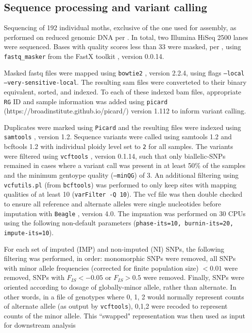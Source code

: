 \documentclass[fleqn,11pt]{wlpeerj}
\begin{document}
\subsection*{Sequence processing and variant calling} Sequencing of 192
individual moths, exclusive of the one used for assembly,  as performed on
reduced genomic DNA per \cite{PARCHMAN:2012ca}. In total, two  Illumina HiSeq
2500 lanes were sequenced. Bases with quality scores less than 33 were masked,
per \cite{Yun:2014dn},  using \texttt{fastq\_masker} from the FastX toolkit
\citep{citeulike:9103573}, version 0.0.14.

Masked fastq files were mapped using \texttt{bowtie2} \cite{Langmead:2012jh},
version 2.2.4, using flags \texttt{--local --very-sensitive-local}.  The
resulting  sam files were converteted to their binary equivalent, sorted, and
indexed. To each of these indexed bam files, appropriate \texttt{RG} ID and
sample information was added using \texttt{picard}
(https://broadinstitute.github.io/picard/) version 1.112 to inform variant
calling.

Duplicates were marked using \texttt{Picard} and the resulting files were
indexed using \texttt{samtools} \citep{Li:2009ka}, version 1.2.  Sequence
variants were called using samtools 1.2 and bcftools 1.2 with individual  ploidy
level set to \texttt{2} for all samples.  The variants were filtered  using
\texttt{vcftools} \cite{Danecek:2011gz}, version 0.1.14, such that only
biallelic-SNPs remained in cases where a variant call was present in at least
50\% of the samples and the minimum gentoype quality (\texttt{--minQG}) of 3. An
additional filtering using \texttt{vcfutils.pl} (from \texttt{bcftools}) was
performed to only keep sites with mapping qualities of at least 10
(\texttt{varFilter -Q 10}). The vcf file was then double checked to ensure all
reference and alternate alleles were single nucleotides before imputation with
\texttt{Beagle} \citep{Browning:2007ge}, version 4.0.  The impuation was
performed on 30 CPUs using the following non-default parameters
(\texttt{phase-its=10, burnin-its=20, impute-its=10}).

For each set of imputed (IMP) and non-imputed (NI) SNPs, the following filtering
was performed, in order: monomorphic SNPs were removed, all SNPs with minor
allele frequencies (corrected for finite population size) $< 0.01$ were removed,
SNPs with $F_{IS} < -0.05$ or $F_{IS} > 0.5$ were removed.  Finally, SNPs were
oriented  according to dosage of globally-minor allele, rather than alternate.
In other words,  in a file of genotypes where 0, 1, 2 would normally represent
counts of alternate allele  (as output by \texttt{vcftools}), 0,1,2 were recoded
to represent counts of the  minor allele.  This ``swapped" representation was
then used as input for  downstream analysis
\end{document}
